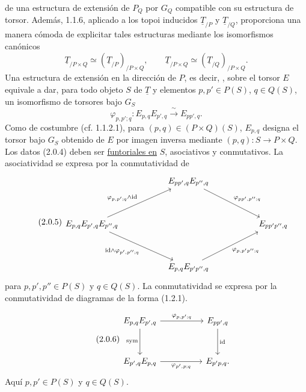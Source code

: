 de una estructura de extensión de $P_Q$ por $G_Q$ compatible con su
estructura de torsor. Además, 1.1.6, aplicado a los topoi inducidos
$\underline T_{/P}$ y $\underline T_{/Q}$, proporciona una manera
cómoda de explicitar tales estructuras mediante los isomorfismos
canónicos
\[
 \underline T_{/P\times Q}\simeq
 (\underline T_{/P})_{/P\times Q},\qquad
 \underline T_{/P\times Q}\simeq
 (\underline T_{/Q})_{/P\times Q}.
\]
Una estructura de extensión en la dirección de $P$, es decir,
, sobre el torsor $E$
equivale a dar, para todo objeto $S$ de $\underline T$ y elementos
$p,p'\in P(S)$, $q\in Q(S)$, un isomorfismo de torsores bajo $G_S$
\begin{equation}\tag{2.0.4}
 \varphi_{p,p';q}:E_{p,q}E_{p',q}
 \xrightarrow{\ \sim\ }E_{pp',q}.
\end{equation}
Como de costumbre (cf. 1.1.2.1), para
$(p,q)\in(P\times Q)(S)$, $E_{p,q}$ designa el torsor bajo $G_S$
obtenido de $E$ por imagen inversa mediante
$(p,q):S\longrightarrow P\times Q$. Los datos (2.0.4) deben ser
\underline{funtoriales en} $S$, asociativos y conmutativos. La
asociatividad se expresa por la conmutatividad de
\begin{equation}\tag{2.0.5}
\begin{tikzcd}[column sep=5.1em,row sep=3.4em]
 & E_{pp',q}E_{p'',q}
   \arrow[rd,"{\varphi_{pp',p'';q}}"] & \\
 E_{p,q}E_{p',q}E_{p'',q}
   \arrow[ru,"{\sisi{\varphi_{p,p;q}}{\varphi_{p,p';q}}\wedge\mathrm{id}}"]
   \arrow[rd,"{\mathrm{id}\wedge\varphi_{p',p'';q}}"']
 && E_{pp'p'',q} \\
 & E_{p,q}E_{p'p'',q}
   \arrow[ru,"{\varphi_{p,p'p'';q}}"'] &
\end{tikzcd}
\end{equation}
para $p,p',p''\in P(S)$ y $q\in Q(S)$. La conmutatividad se expresa
por la conmutatividad de diagramas de la forma (1.2.1).


\begin{equation}\tag{2.0.6}
\begin{tikzcd}[column sep=5em,row sep=3.1em]
 E_{p,q}E_{p',q} \arrow[r,"{\varphi_{p,p';q}}"]
   \arrow[d,"\mathrm{sym}"']
 & E_{pp',q} \arrow[d,"\mathrm{id}"] \\
 E_{p',q}E_{p,q} \arrow[r,"{\varphi_{p',p;q}}"']
 & E_{p'p,q}.
\end{tikzcd}
\end{equation}
Aquí $p,p'\in P(S)$ y $q\in Q(S)$.

